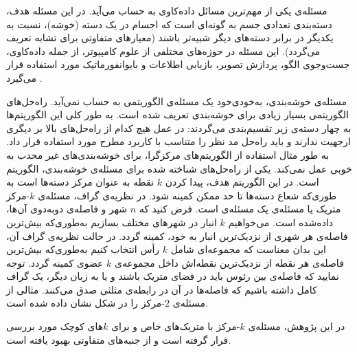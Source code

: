 


مسئله‌ی  یکی از مهم‌ترین مسائل داده‌کاوی به حساب می‌آید. در این مسئله هدف، دسته‌بندی تعدادی جسم به گونه‌ای است که اجسام در یک دسته (خوشه)، نسبت به یکدیگر در برابر  دسته‌های دیگر شبیه‌تر باشند (معیار‌های متفاوتی برای تشابه تعریف می‌گردد). این مسئله در حوزه‌های مختلفی از علوم کامپیوتر، از جمله داده‌کاوی، جست‌وجوی الگو، پردازش تصویر، بازیابی اطلاعات و بایوانفورماتیک مورد استفاده قرار می‌گیرد .

مسئله‌ی خوشه‌بندی، به‌خودی‌خود یک مسئله‌ی الگوریتمی به حساب نمی‌آید. راه‌حل‌های الگوریتمی بسیار زیادی برای خوشه‌بندی تعریف شده است. به طور کلی این الگوریتم‌ها به چهار دسته‌ی زیر تقسیم‌بندی می‌گردند:
در عمل هیچ کدام از راه‌حل‌های بالا بر دیگری ارجهیت ندارند و باید راه‌حل مد نظر را متناسب با کاربرد مطرح مورد استفاده قرار داد. به طور مثال استفاده از الگوریتم‌های مرکزگرا، برای خوشه‌بندی‌های غیر محدب به خوبی عمل نمی‌کند.
یکی از راه‌حل‌های شناخته شده برای مسئله‌ی خوشه‌بندی، الگوریتم  است. در این الگوریتم هدف، پیدا کردن $k$ نقطه به عنوان مرکز دسته‌ها است به طوری‌که شعاع دسته‌ها تا حد ممکن کمینه شود. در نظریه‌ی گراف، مسئله‌ی $k$-مرکز متریک یا مسئله‌ی  یک مسئله‌ی  است. فرض کنید که $n$ شهر و فاصله‌ی دوبه‌دوی آن‌ها، داده‌شده است. می‌خواهیم $k$ انبار در شهرهای مختلف بسازیم به‌طوری‌که بیش‌ترین فاصله‌ی هر شهری از نزدیک‌ترین انبار به خود، کمینه گردد. در حالت نظریه‌ی گراف آن، این بدان معناست که مجموعه‌ای شامل $k$ رأس انتخاب کنیم به‌طوری‌که بیش‌ترین فاصله‌ی هر نقطه از نزدیک‌ترین نقطه‌اش داخل مجموعه‌ی $k$ عضوی کمینه گردد.  توجه نمایید که فاصله‌ی بین رئوس باید در فضای متریک باشند و یا به زبان دیگر، یک گراف کامل داشته باشیم که فاصله‌ها در آن در رابطه‌ی مثلثی صدق می‌کنند. مثالی از مسئله‌ی $2$-مرکز را در شکل  نشان داده شده است.

در این پژوهش، مسئله‌ی $k$-مرکز با متریک‌های خاص و برای $k$های کوچک مورد بررسی قرار گرفته است و از‌ جنبه‌های متفاوتی بهبود یافته است.

